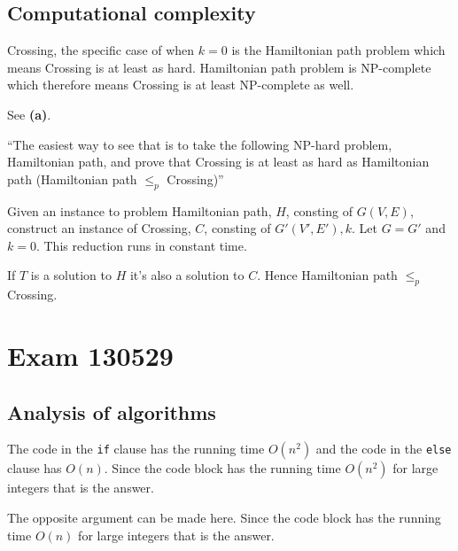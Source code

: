 \documentclass[a4paper]{article}
\newenvironment{task}[1]
{
	\begin{description}[align=right]
		\item [#1]
}{		%
	\end{description}
}
\newcommand{\taskref}[1]{\textbf{#1}}
\DeclareMathOperator{\*}{\cdot}
\begin{document}
\subsection*{Computational complexity}

\begin{task}{6. (a)}
	 Crossing, the specific case of when $k=0$ is the Hamiltonian path problem which means Crossing is at least as hard. Hamiltonian path problem is NP-complete which therefore means Crossing is at least NP-complete as well.
\end{task}

\begin{task}{(b)}
	 See \taskref{(a)}.
\end{task}

\begin{task}{(c)}
	 ``The easiest way to see that is to take the following NP-hard problem, Hamiltonian path, and prove that Crossing is at least as hard as Hamiltonian path (Hamiltonian path $\leq_p$ Crossing)''
\end{task}

\begin{task}{(d)}
	\qquad Given an instance to problem Hamiltonian path, $H$, consting of $G(V,E)$, construct an instance of Crossing, $C$, consting of $G'(V',E'), k$. Let $G=G'$ and $k=0$. This reduction runs in constant time.
	
	If $T$ is a solution to $H$ it's also a solution to $C$. Hence Hamiltonian path $\leq_p$ Crossing.
\end{task}

\pagebreak
\section*{Exam 130529}
\subsection*{Analysis of algorithms}

\begin{task}{1. (a)}
	 The code in the \texttt{if} clause has the running time $O(n^2)$ and the code in the \texttt{else} clause has $O(n)$. Since the code block has the running time $O(n^2)$ for large integers that is the answer.
\end{task}

\begin{task}{2. (a)}
	 The opposite argument can be made here. Since the code block has the running time $O(n)$ for large integers that is the answer.
\end{task}
\end{document}
